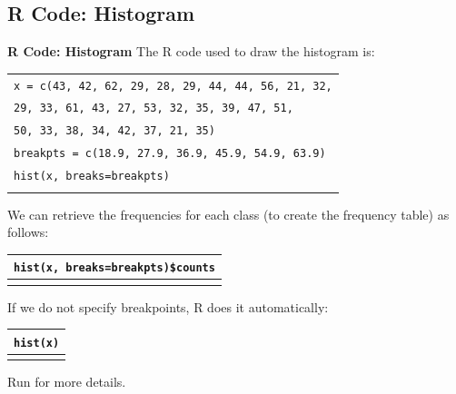 \documentclass[compress]{beamer}        %
\makeatletter
\newcommand{\tcb}{\textcolor{beamer@blendedblue}}
\makeatother
\begin{document}
\subsection{R Code: Histogram}
\begin{frame}{\bf \tcb{R Code: Histogram}}
The R code used to draw the histogram is:\\[0.1cm]
\begin{tabular}{|l|}
\hline
\texttt{x = c(43, 42, 62, 29, 28, 29, 44, 44, 56, 21, 32,} \\
\hspace{1.4cm}\texttt{29, 33, 61, 43, 27, 53, 32, 35, 39, 47, 51,} \\
\hspace{1.4cm}\texttt{50, 33, 38, 34, 42, 37, 21, 35)}\\
\texttt{breakpts = c(18.9, 27.9, 36.9, 45.9, 54.9, 63.9)}\\
\texttt{hist(x, breaks=breakpts)}\\
\hline
\multicolumn{1}{c}{}\\[-0.1cm]
\end{tabular}
We can retrieve the frequencies for each class (to create the frequency table) as follows:\\[0.1cm]
\begin{tabular}{|l|}
\hline
\texttt{hist(x, breaks=breakpts)\$counts} \\
\hline
\multicolumn{1}{c}{}\\[-0.1cm]
\end{tabular}
\newline
If we do not specify breakpoints, R does it automatically:\\[0.1cm]
\begin{tabular}{|l|}
\hline
\texttt{hist(x)}\\
\hline
\multicolumn{1}{c}{}\\[-0.1cm]
\end{tabular}
\newline
Run  for more details.
\end{frame}
\end{document}
